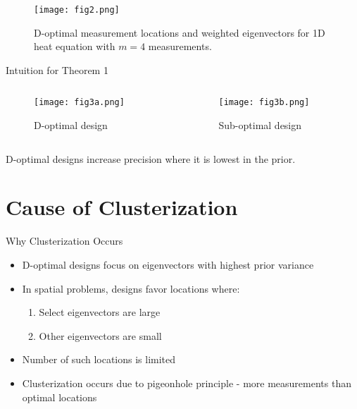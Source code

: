 \documentclass[aspectratio=169]{beamer}
\begin{document}
\begin{frame}
\begin{figure}
    \centering
    \texttt{[image: fig2.png]}
    \caption{D-optimal measurement locations and weighted eigenvectors for 1D heat equation with $m=4$ measurements.}
\end{figure}
\end{frame}

\begin{frame}{Intuition for Theorem 1}
\begin{columns}
\begin{column}{0.5\textwidth}
\begin{figure}
    \centering
    \texttt{[image: fig3a.png]}
    \caption{D-optimal design}
\end{figure}
\end{column}
\begin{column}{0.5\textwidth}
\begin{figure}
    \centering
    \texttt{[image: fig3b.png]}
    \caption{Sub-optimal design}
\end{figure}
\end{column}
\end{columns}
D-optimal designs increase precision where it is lowest in the prior.
\end{frame}

\section{Cause of Clusterization}

\begin{frame}{Why Clusterization Occurs}
\begin{itemize}
    \item D-optimal designs focus on eigenvectors with highest prior variance
    \item In spatial problems, designs favor locations where:
    \begin{enumerate}
        \item Select eigenvectors are large
        \item Other eigenvectors are small
    \end{enumerate}
    \item Number of such locations is limited
    \item Clusterization occurs due to pigeonhole principle - more measurements than optimal locations
\end{itemize}
\end{frame}
\end{document}
